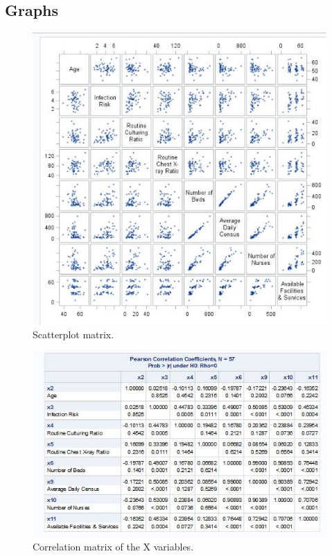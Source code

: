 \documentclass[a4paper,9pt]{article}\usepackage[]{graphicx}\usepackage[]{color}
\begin{document}
\subsection*{Graphs}
\begin{figure}[h]
\centering
\includegraphics[scale=0.6]{14569224_800977350004906_642069745_n.png}
\caption{Scatterplot matrix. }
\end{figure}

\begin{figure}[H]
\centering
\includegraphics[scale=0.6]{14543358_800977370004904_386370053_n.png}
\caption{Correlation matrix of the X variables. }
\end{figure}
\end{document}
